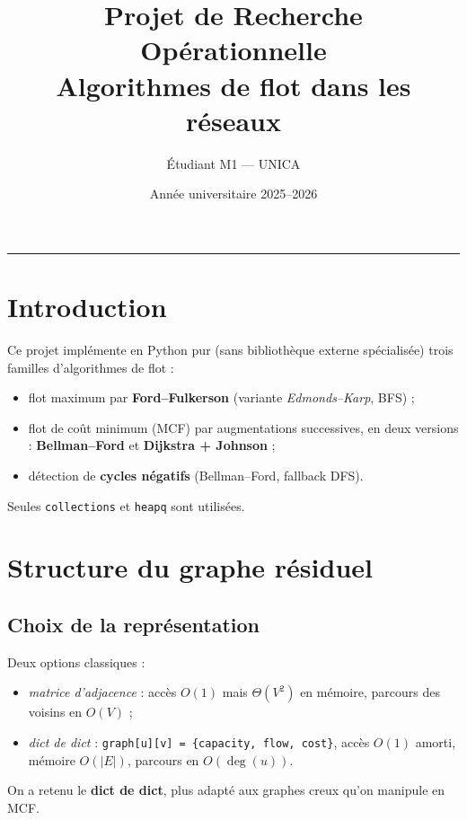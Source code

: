 \documentclass[11pt,a4paper]{article}
\title{
    \vspace{-1.5cm}
    \textbf{Projet de Recherche Opérationnelle} \\[0.4em]
    \large Algorithmes de flot dans les réseaux
}
\author{Étudiant M1 --- UNICA}
\date{Année universitaire 2025--2026}
\begin{document}
\maketitle
\vspace{-1em}

\tableofcontents
\vspace{1em}
\hrule
\vspace{1em}

\section{Introduction}

Ce projet implémente en Python pur (sans bibliothèque externe spécialisée)
trois familles d'algorithmes de flot :
\begin{itemize}
    \item flot maximum par \textbf{Ford--Fulkerson} (variante
        \emph{Edmonds--Karp}, BFS) ;
    \item flot de coût minimum (MCF) par augmentations successives, en deux
        versions : \textbf{Bellman--Ford} et \textbf{Dijkstra + Johnson} ;
    \item détection de \textbf{cycles négatifs} (Bellman--Ford, fallback DFS).
\end{itemize}
Seules \texttt{collections} et \texttt{heapq} sont utilisées.

\section{Structure du graphe résiduel}
\label{sec:residuel}

\subsection{Choix de la représentation}

Deux options classiques :
\begin{itemize}
    \item \emph{matrice d'adjacence} : accès $O(1)$ mais $\Theta(V^2)$ en
        mémoire, parcours des voisins en $O(V)$ ;
    \item \emph{dict de dict} : \texttt{graph[u][v] =
        \{capacity, flow, cost\}}, accès $O(1)$ amorti, mémoire $O(|E|)$,
        parcours en $O(\deg(u))$.
\end{itemize}
On a retenu le \textbf{dict de dict}, plus adapté aux graphes creux qu'on
manipule en MCF.
\end{document}
